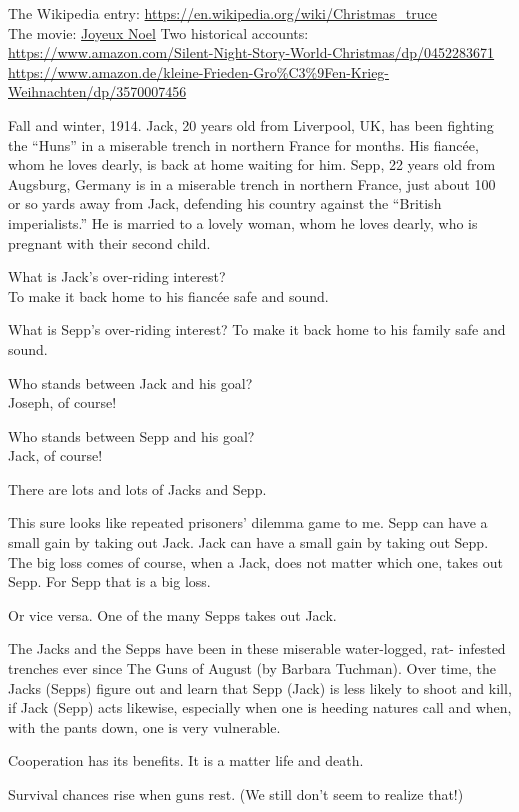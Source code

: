 \documentclass[
]{book}
\begin{document}
The Wikipedia entry: \url{https://en.wikipedia.org/wiki/Christmas_truce}\\
The movie: \href{https://en.wikipedia.org/wiki/Joyeux_No\%C3\%ABl}{Joyeux Noel}
Two historical accounts:
\url{https://www.amazon.com/Silent-Night-Story-World-Christmas/dp/0452283671}
\url{https://www.amazon.de/kleine-Frieden-Gro\%C3\%9Fen-Krieg-Weihnachten/dp/3570007456}

Fall and winter, 1914. Jack, 20 years old from Liverpool, UK, has been fighting the ``Huns'' in a miserable trench in northern France for months. His fiancée, whom he loves dearly, is back at home waiting for him.
Sepp, 22 years old from Augsburg, Germany is in a miserable trench in northern France, just about 100 or so yards away from Jack, defending his country against the ``British imperialists.'' He is married to a lovely woman, whom he loves dearly, who is pregnant with their second child.

What is Jack's over-riding interest?\\
To make it back home to his fiancée safe and sound.

What is Sepp's over-riding interest?
To make it back home to his family safe and sound.

Who stands between Jack and his goal?\\
Joseph, of course!

Who stands between Sepp and his goal?\\
Jack, of course!

There are lots and lots of Jacks and Sepp.

This sure looks like repeated prisoners' dilemma game to me. Sepp can have a small gain by taking out Jack. Jack can have a small gain by taking out Sepp. The big loss comes of course, when a Jack, does not matter which one, takes out Sepp. For Sepp that is a big loss.

Or vice versa. One of the many Sepps takes out Jack.

The Jacks and the Sepps have been in these miserable water-logged, rat- infested trenches ever since The Guns of August (by Barbara Tuchman). Over time, the Jacks (Sepps) figure out and learn that Sepp (Jack) is less likely to shoot and kill, if Jack (Sepp) acts likewise, especially when one is heeding natures call and when, with the pants down, one is very vulnerable.

Cooperation has its benefits. It is a matter life and death.

Survival chances rise when guns rest. (We still don't seem to realize that!)
\end{document}
